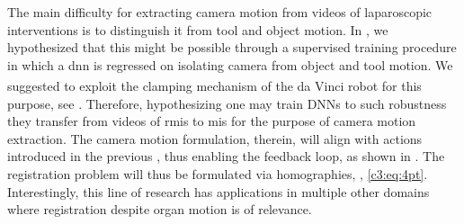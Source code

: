 The main difficulty for extracting camera motion from videos of laparoscopic interventions is to distinguish it from tool and object motion. In , we hypothesized that this might be possible through a supervised training procedure in which a \acrshort{dnn} is regressed on isolating camera from object and tool motion. We suggested to exploit the clamping mechanism of the da Vinci\textsuperscript{\textregistered} robot for this purpose, see . Therefore, hypothesizing one may train DNNs to such robustness they transfer from videos of \acrshort{rmis} to \acrshort{mis} for the purpose of camera motion extraction. The camera motion formulation, therein, will align with actions introduced in the previous , thus enabling the feedback loop, as shown in . The registration problem will thus be formulated via homographies, , \eqref{c3:eq:4pt}. Interestingly, this line of research has applications in multiple other domains where registration despite organ motion is of relevance.


